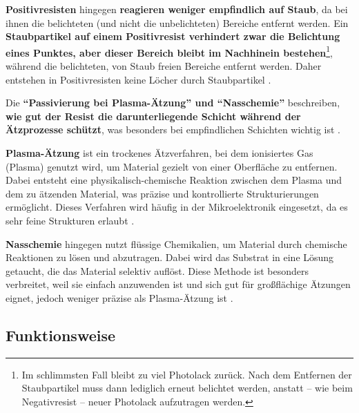 \documentclass{article} %
\begin{document}
\textbf{Positivresisten} hingegen \textbf{reagieren weniger empfindlich auf Staub}, da bei ihnen die belichteten (und nicht die unbelichteten) Bereiche entfernt werden. Ein \textbf{Staubpartikel auf einem Positivresist verhindert zwar die Belichtung eines Punktes, aber dieser Bereich bleibt im Nachhinein bestehen}\footnote{Im schlimmsten Fall bleibt zu viel Photolack zurück. Nach dem Entfernen der Staubpartikel muss dann lediglich erneut belichtet werden, anstatt -- wie beim Negativresist -- neuer Photolack aufzutragen werden.}, während die belichteten, von Staub freien Bereiche entfernt werden. Daher entstehen in Positivresisten keine Löcher durch Staubpartikel \cite{wias_photoresist}.

\vspace{1em}

Die \textbf{``Passivierung bei Plasma-Ätzung'' und ``Nasschemie''} beschreiben, \textbf{wie gut der Resist die darunterliegende Schicht während der Ätzprozesse schützt}, was besonders bei empfindlichen Schichten wichtig ist \cite{schmid2024}. 

\vspace{1em}

\textbf{Plasma-Ätzung} ist ein trockenes Ätzverfahren, bei dem ionisiertes Gas (Plasma) genutzt wird, um Material gezielt von einer Oberfläche zu entfernen. Dabei entsteht eine physikalisch-chemische Reaktion zwischen dem Plasma und dem zu ätzenden Material, was präzise und kontrollierte Strukturierungen ermöglicht. Dieses Verfahren wird häufig in der Mikroelektronik eingesetzt, da es sehr feine Strukturen erlaubt \cite{madou2002, wolf2000}.

\vspace{1em}

\textbf{Nasschemie} hingegen nutzt flüssige Chemikalien, um Material durch chemische Reaktionen zu lösen und abzutragen. Dabei wird das Substrat in eine Lösung getaucht, die das Material selektiv auflöst. Diese Methode ist besonders verbreitet, weil sie einfach anzuwenden ist und sich gut für großflächige Ätzungen eignet, jedoch weniger präzise als Plasma-Ätzung ist \cite{rogers2008, gerald2006}.





\vspace{1em}

\subsection{Funktionsweise}
\end{document}
